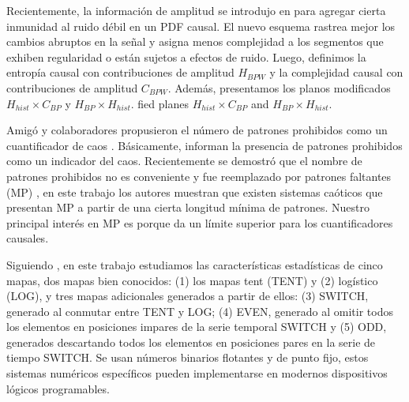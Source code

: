 Recientemente, la información de amplitud se introdujo en \cite{Fadlallah2013} para agregar cierta inmunidad al ruido débil en un PDF causal.
El nuevo esquema rastrea mejor los cambios abruptos en la señal y asigna menos complejidad a los segmentos que exhiben regularidad o están sujetos a efectos de ruido.
Luego, definimos la entropía causal con contribuciones de amplitud $H_{BPW}$ y la complejidad causal con contribuciones de amplitud $C_{BPW}$.
Además, presentamos los planos modificados $H_{hist} \times C_{BP} $ y $H_{BP} \times H_{hist}$.
fied planes $H_{hist} \times C_{BP}$ and $H_{BP} \times H_{hist}$.

Amigó y colaboradores propusieron el número de patrones prohibidos como un cuantificador de caos \cite{Amigo2007a}.
Básicamente, informan la presencia de patrones prohibidos como un indicador del caos.
Recientemente se demostró que el nombre de patrones prohibidos no es conveniente y fue reemplazado por patrones faltantes (MP) \cite{Rosso2012}, en este trabajo los autores muestran que existen sistemas caóticos que presentan MP a partir de una cierta longitud mínima de patrones.
Nuestro principal interés en MP es porque da un límite superior para los cuantificadores causales.

Siguiendo \cite{Nagaraj2008}, en este trabajo estudiamos las características estadísticas de cinco mapas, dos mapas bien conocidos: (1) los mapas tent (TENT) y (2) logístico (LOG), y tres mapas adicionales generados a partir de ellos: (3) SWITCH, generado al conmutar entre TENT y LOG; (4) EVEN, generado al omitir todos los elementos en posiciones impares de la serie temporal SWITCH y (5) ODD, generados descartando todos los elementos en posiciones pares en la serie de tiempo SWITCH.
Se usan números binarios flotantes y de punto fijo, estos sistemas numéricos específicos pueden implementarse en modernos dispositivos lógicos programables.